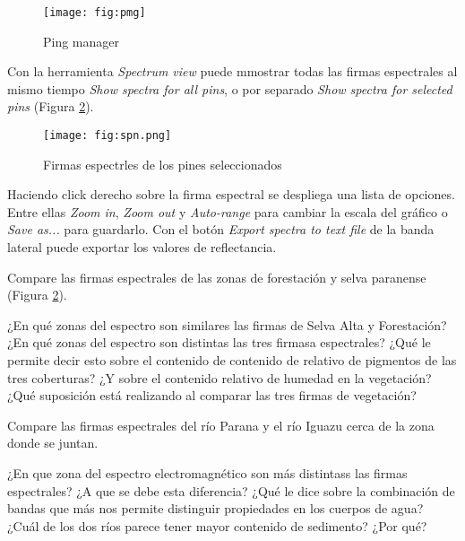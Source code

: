 \begin{figure}[h!]
    \centering
    \texttt{[image: fig:pmg]}
    \caption{Ping manager}
    \label{fig:pmg}
\end{figure}

Con la herramienta \emph{Spectrum view} puede mmostrar todas las firmas espectrales al mismo tiempo \emph{Show spectra for all pins}, o por separado \emph{Show spectra for selected pins} (Figura \ref{fig:spn}).

\begin{figure}[h!]
    \centering
    \texttt{[image: fig:spn.png]}
    \caption{Firmas espectrles de los pines seleccionados}
    \label{fig:spn}
\end{figure}

Haciendo click derecho sobre la firma espectral se despliega una lista de opciones. Entre ellas \emph{Zoom in}, \emph{Zoom out} y \emph{Auto-range} para cambiar la escala del gráfico o \emph{Save as...} para guardarlo.
Con el botón \emph{Export spectra to text file} de la banda lateral puede exportar los valores de reflectancia.

Compare las firmas espectrales de las zonas de forestación y selva paranense (Figura \ref{fig:spn}).%

\begin{que}
    ¿En qué zonas del espectro son similares las firmas de Selva Alta %
    y Forestación? ¿En qué zonas del espectro son distintas las tres firmasa espectrales? ¿Qué le permite decir esto sobre el contenido de contenido de relativo de pigmentos de las tres coberturas? ¿Y sobre el contenido relativo de humedad en la vegetación? ¿Qué suposición está realizando al comparar las tres firmas de vegetación?
\end{que}

Compare las firmas espectrales del río Parana y el río Iguazu cerca de la zona donde se juntan.

\begin{que}
    ¿En que zona del espectro electromagnético son más distintass las firmas espectrales? ¿A que se debe esta diferencia? ¿Qué le dice sobre la combinación de bandas que más nos permite distinguir propiedades en los cuerpos de agua? ¿Cuál de los dos ríos parece tener mayor contenido de sedimento? ¿Por qué?
\end{que}
